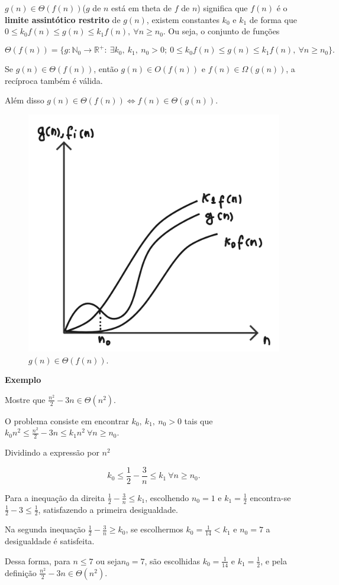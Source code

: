 $g(n)\in\Theta(f(n))$($g$ de $n$ está em theta de $f$ de $n$) significa que $f(n)$ é o \textbf{limite assintótico restrito} de $g(n)$, existem constantes $k_0$ e $k_1$ de forma que $0\leq k_0f(n) \leq g(n) \leq k_1f(n), \ \forall n\geq n_0$. Ou seja, o conjunto de funções

\[\Theta(f(n))=\{g: \mathbb{N}_0 \rightarrow \mathbb{R}^{+}: \ \exists k_0, \ k_1, \ n_0 > 0; \ 0\leq k_0f(n) \leq g(n) \leq k_1f(n), \ \forall n \geq n_0 \}.\]

Se $g(n)\in\Theta(f(n))$, então $g(n)\in O(f(n))$ e $f(n)\in\Omega(g(n))$, a recíproca também é válida.

Além disso $g(n)\in\Theta(f(n)) \Leftrightarrow f(n)\in\Theta(g(n))$.

\begin{figure}
  \centering
  \includegraphics[width=0.4\linewidth]{img/Theta.png}
    \caption{$g(n)\in\Theta(f(n))$.}
    \label{Theta}
\end{figure}

\textbf{Exemplo}

Mostre que $\frac{n^2}{2}-3n \in \Theta(n^2)$.

O problema consiste em encontrar $k_0, \ k_1, \ n_0 > 0$ tais que $k_0n^2\leq \frac{n^2}{2}-3n\leq k_1n^2 \ \forall n\geq n_0$.

Dividindo a expressão por $n^2$

\[k_0\leq \frac{1}{2} - \frac{3}{n} \leq k_1 \ \forall n\geq n_0.\]

Para a inequação da direita $\frac{1}{2}-\frac{3}{n}\leq k_1$, escolhendo $n_0=1$ e $k_1=\frac{1}{2}$ encontra-se $\frac{1}{2} -3 \leq \frac{1}{2}$, satisfazendo a primeira desigualdade.

Na segunda inequação $\frac{1}{2}-\frac{3}{n}\geq k_0$, se escolhermos $k_0=\frac{1}{14} < k_1$ e $n_0=7$ a desigualdade é satisfeita.

Dessa forma, para $n\leq 7$ ou seja$n_0=7$, são escolhidas $k_0=\frac{1}{14}$ e $k_1=\frac{1}{2}$, e pela definição $\frac{n^2}{2}-3n\in\Theta(n^2)$.

